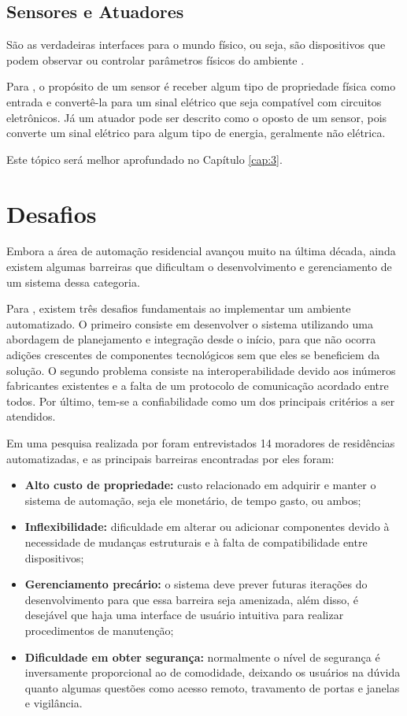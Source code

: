 \subsection{Sensores e Atuadores}
São as verdadeiras interfaces para o mundo físico, ou seja, são dispositivos que podem observar ou controlar
parâmetros físicos do ambiente \cite{karl_willig2005}.

Para , o propósito de um sensor é receber algum tipo de propriedade física como
entrada e convertê-la para um sinal elétrico que seja compatível com circuitos eletrônicos. Já um atuador
pode ser descrito como o oposto de um sensor, pois converte um sinal elétrico para algum tipo de energia,
geralmente não elétrica.

Este tópico será melhor aprofundado no Capítulo \ref{cap:3}.

\section{Desafios}
Embora a área de automação residencial avançou muito na última década, ainda existem algumas barreiras que
dificultam o desenvolvimento e gerenciamento de um sistema dessa categoria.

Para , existem três desafios fundamentais ao implementar um ambiente
automatizado. O primeiro consiste em desenvolver o sistema utilizando uma abordagem de planejamento e
integração desde o início, para que não ocorra adições crescentes de componentes tecnológicos sem que eles se
beneficiem da solução. O segundo problema consiste na interoperabilidade devido aos inúmeros fabricantes
existentes e a falta de um protocolo de comunicação acordado entre todos. Por último, tem-se a confiabilidade
como um dos principais critérios a ser atendidos.

Em uma pesquisa realizada por  foram entrevistados 14 moradores de
residências automatizadas, e as principais barreiras encontradas por eles foram:
\begin{itemize}
	\item \textbf{Alto custo de propriedade:} custo relacionado em adquirir e manter o sistema de automação, seja
	ele monetário, de tempo gasto, ou ambos;
	\item \textbf{Inflexibilidade:} dificuldade em alterar ou adicionar componentes devido à necessidade de
	mudanças estruturais e à falta de compatibilidade entre dispositivos;
	\item \textbf{Gerenciamento precário:} o sistema deve prever futuras iterações do desenvolvimento para que
	essa barreira seja amenizada, além disso, é desejável que haja uma interface de usuário intuitiva
	para realizar procedimentos de manutenção;
	\item \textbf{Dificuldade em obter segurança:}  normalmente o nível de segurança é inversamente
	proporcional ao de comodidade, deixando os usuários na dúvida quanto algumas questões como acesso
	remoto, travamento de portas e janelas e vigilância.
\end{itemize}

